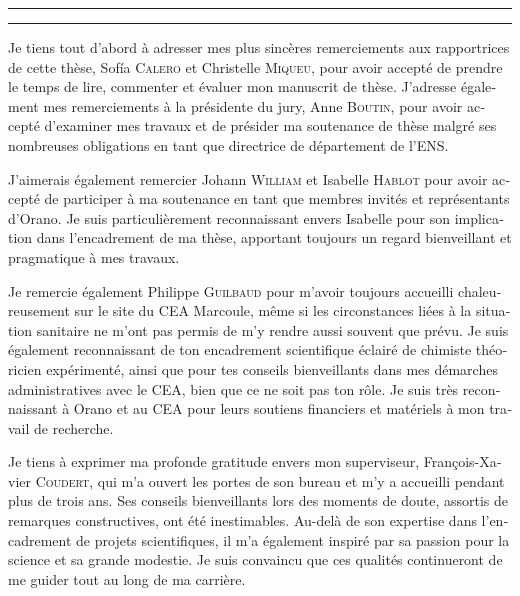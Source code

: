 \begin{otherlanguage}{french}

\hrule\relax
\vspace*{.9\baselineskip}%
\raggedright{\huge{}}\par%
\vspace*{1.1\baselineskip}%
\hrule\relax
\vspace*{\baselineskip}%
\thispagestyle{empty}

\begingroup
\itshape

Je tiens tout d'abord à adresser mes plus sincères remerciements aux rapportrices de cette thèse, Sof{\'{i}}a \textsc{Calero} et Christelle \textsc{Miqueu}, pour avoir accepté de prendre le temps de lire, commenter et évaluer mon manuscrit de thèse. 
J'adresse également mes remerciements à la présidente du jury, Anne \textsc{Boutin}, pour avoir accepté d'examiner mes travaux et de présider ma soutenance de thèse malgré ses nombreuses obligations en tant que directrice de département de l'ENS.

J'aimerais également remercier Johann \textsc{William} et Isabelle \textsc{Hablot} pour avoir accepté de participer à ma soutenance en tant que membres invités et représentants d'Orano. Je suis particulièrement reconnaissant envers Isabelle pour son implication dans l'encadrement de ma thèse, apportant toujours un regard bienveillant et pragmatique à mes travaux.

Je remercie également Philippe \textsc{Guilbaud} pour m'avoir toujours accueilli chaleureusement sur le site du CEA Marcoule, même si les circonstances liées à la situation sanitaire ne m'ont pas permis de m'y rendre aussi souvent que prévu. Je suis également reconnaissant de ton encadrement scientifique éclairé de chimiste théoricien expérimenté, ainsi que pour tes conseils bienveillants dans mes démarches administratives avec le CEA, bien que ce ne soit pas ton rôle. Je suis très reconnaissant à Orano et au CEA pour leurs soutiens financiers et matériels à mon travail de recherche.

Je tiens à exprimer ma profonde gratitude envers mon superviseur, François-Xavier \textsc{Coudert}, qui m'a ouvert les portes de son bureau et m'y a accueilli pendant plus de trois ans. Ses conseils bienveillants lors des moments de doute, assortis de remarques constructives, ont été inestimables. Au-delà de son expertise dans l'encadrement de projets scientifiques, il m'a également inspiré par sa passion pour la science et sa grande modestie. Je suis convaincu que ces qualités continueront de me guider tout au long de ma carrière.


\end{otherlanguage}
